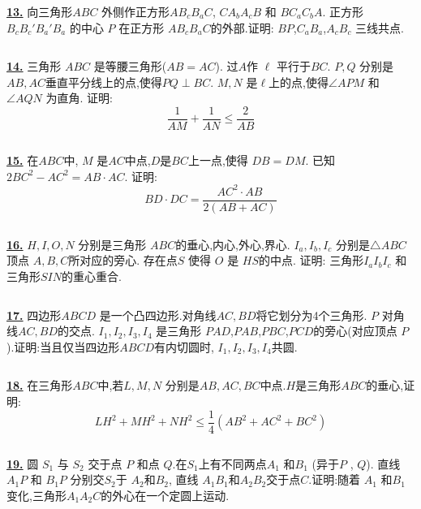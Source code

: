 \documentclass{article}
\begin{document}
$$ $$

\href{http://www.artofproblemsolving.com/Forum/viewtopic.php?p=916020#p916020}{\bf 13.} 向三角形$ABC$ 外侧作正方形$ AB_{c}B_{a}C$, $ CA_{b}A_{c}B$ 和 $ BC_{a}C_{b}A$. 正方形 $ B_{c}B_{c}'B_{a}'B_{a}$ 的中心 $ P$ 在正方形 $ AB_{c}B_{a}C$的外部.证明: $ BP$,$C_{a}B_{a}$,$ A_{c}B_{c}$ 三线共点.

$$ $$

\href{http://www.artofproblemsolving.com/Forum/viewtopic.php?p=852412#p852412}{\bf 14.} 三角形 $ABC$ 是等腰三角形($AB=AC$). 过$A$作 $\ell$ 平行于$BC$. $P,Q$ 分别是 $AB,AC$垂直平分线上的点,使得$PQ\perp BC$. $M,N$ 是$\ell$上的点,使得$\angle APM$ 和 $\angle AQN$ 为直角. 证明:
$$\frac{1}{AM}+\frac1{AN}\leq\frac2{AB}$$


$$ $$

\href{http://www.artofproblemsolving.com/Forum/viewtopic.php?p=835050#p835050}{\bf 15.} 在$ABC$中, $M$ 是$AC$中点,$D$是$BC$上一点,使得 $DB=DM$. 已知 $2BC^{2}-AC^{2}=AB\cdot AC$. 证明: \[BD\cdot DC=\frac{AC^{2}\cdot AB}{2(AB+AC)}\]

$$ $$

\href{http://www.artofproblemsolving.com/Forum/viewtopic.php?p=641483#p641483}{\bf 16.} $H,I,O,N$ 分别是三角形 $ABC$的垂心,内心,外心,界心. $I_{a},I_{b},I_{c}$ 分别是$\triangle ABC$ 顶点 $A,B,C$所对应的旁心. 存在点$S$ 使得 $O$ 是 $HS$的中点. 证明: 三角形$I_{a}I_{b}I_{c}$ 和三角形$SIN$的重心重合.

$$ $$

\href{http://www.artofproblemsolving.com/Forum/viewtopic.php?p=638185#p638185}{\bf 17.} 四边形$ABCD$ 是一个凸四边形.对角线$AC,BD$将它划分为4个三角形. $P$ 对角线$AC,BD$的交点. $I_{1},I_{2},I_{3},I_{4}$ 是三角形 $PAD$,$PAB$,$PBC$,$PCD$的旁心(对应顶点 $P$).证明:当且仅当四边形$ABCD$有内切圆时, $I_{1},I_{2},I_{3},I_{4}$共圆.

$$ $$

\href{http://www.artofproblemsolving.com/Forum/viewtopic.php?p=634198#p634198}{\bf 18.} 在三角形$ABC$中,若$L,M,N$ 分别是$AB,AC,BC$中点.$H$是三角形$ABC$的垂心,证明: $$LH^{2}+MH^{2}+NH^{2}\leq \frac{1}{4}(AB^{2}+AC^{2}+BC^{2})$$

$$ $$

\href{http://www.artofproblemsolving.com/Forum/viewtopic.php?p=118673#p118673}{\bf 19.} 圆 $S_1$ 与 $S_2$ 交于点 $P$ 和点 $Q$.在$S_1$上有不同两点$A_1$ 和$B_1$ (异于$P$ , $Q$). 直线$A_1P$ 和 $B_1P$ 分别交$S_2$于 $A_2$和$B_2$, 直线 $A_1B_1$和$A_2B_2$交于点$C$.证明:随着 $A_1$ 和$B_1$变化,三角形$A_1A_2C$的外心在一个定圆上运动.
\end{document}

